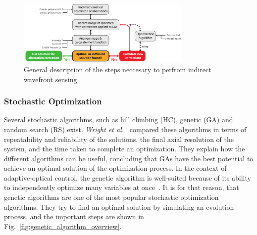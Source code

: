 \begin{figure}[htb]
	\centering
		\includegraphics[width=0.75\textwidth]{images/indirect_wavefront_sensing}
	\caption{General description of the steps neccesary to perfrom indirect wavefront sensing. }
	\label{fig:indirect_wavefront_sensing}
\end{figure}


\subsubsection{Stochastic Optimization}
\label{sec:GeneticAndRandomOptimizationMethods}

Several stochastic algorithms, such as hill climbing (HC), genetic (GA) and random search (RS) exist. \emph{Wright et al.}~\cite{Genetic_compared_to_others} compared these algorithms in terms of repeatability and reliability of the solutions, the final axial resolution of the system, and the time taken to complete an optimization. They explain how the different algorithms can be useful, concluding that GAs have the best potential to achieve an optimal solution of the optimization process. In the context of adaptive-optical control, the genetic algorithm is well-suited because of its ability to independently optimize many variables at once~\cite{Genetic_closed_loop}. It is for that reason, that genetic algorithms are one of the most popular stochastic optimization algorithms. They try to find an optimal solution by simulating an evolution process, and the important steps are shown in Fig.~\ref{fig:genetic_algorithm_overview}. 

